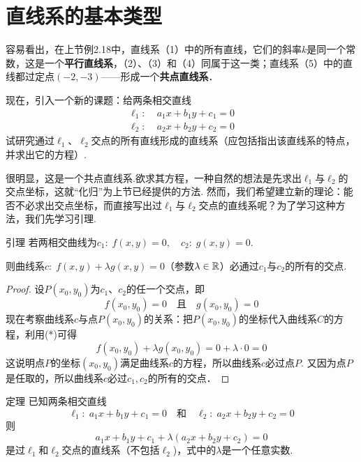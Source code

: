 \section{直线系的基本类型}
容易看出，在上节例2.18中，直线系（1）中的所有直线，它们的斜率$k$是同一个常数，这是一个\textbf{平行直线系}，（2）、（3）和（4）同属于这一类；直线系（5）中的直线都过定点$(-2,-3)$——形成一个\textbf{共点直线系}．

现在，引入一个新的课题：给两条相交直线
\[\begin{split}
\ell_1:\; & a_1x+b_1y+c_1=0\\
\ell_2:\; & a_2x+b_2y+c_2=0    
\end{split}\]
试研究通过$\ell_1$、$\ell_2$交点的所有直线形成的直线系（应包括指出该直线系的特点，并求出它的方程）.

很明显，这是一个共点直线系.欲求其方程，一种自然的想法是先求出$\ell_1$与$\ell_2$的交点坐标，这就“化归”为上节已经提供的方法. 然而，我们希望建立新的理论：能否不必求出交点坐标，而直接写出过$\ell_1$与$\ell_2$交点的直线系呢？为了学习这种方法，我们先学习引理.

\begin{thm}
{引理} 若两相交曲线为$c_1:\; f(x,y)=0,\quad c_2:\; g(x,y)=0$. 

则曲线系$c:\; f(x,y)+\lambda g(x,y)=0$（参数$\lambda\in\mathbb{R}$）必通过$c_1$与$c_2$的所有的交点.    
\end{thm}

\begin{proof}
    设$P(x_0,y_0)$为$c_1$、$c_2$的任一个交点，即
\begin{equation}
  f(x_0,y_0)=0\quad \text{且}\quad g(x_0,y_0)=0 \tag{*}  
\end{equation}
现在考察曲线系$c$与点$P(x_0,y_0)$的关系：把$P(x_0,y_0)$的坐标代入曲线系$C$的方程，利用(*)可得
\[f(x_0,y_0)+\lambda g(x_0,y_0)=0+\lambda\cdot 0=0\]
这说明点$P$的坐标$(x_0,y_0)$满足曲线系$c$的方程，所以曲线系$c$必过点$P$. 又因为点$P$是任取的，所以曲线系$c$必过$c_1,c_2$的所有的交点．
\end{proof}

\begin{thm}
    {定理} 已知两条相交直线
\[\ell_1:\; a_1x+b_1y+c_1=0\quad \text{和}\quad \ell_2:\; a_2x+b_2y+c_2=0\]
则
\begin{equation}
    a_1x+b_1y+c_1+\lambda(a_2x+b_2y+c_2)=0\tag{1}
\end{equation}
是过$\ell_1$和$\ell_2$交点的直线系（不包括$\ell_2$)，式中的$\lambda$是一个任意实数.
\end{thm}

